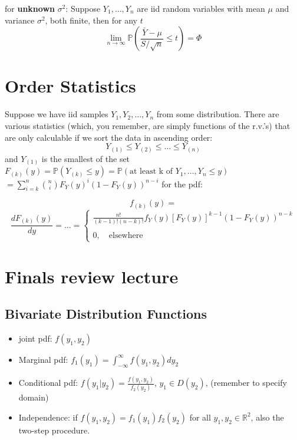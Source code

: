\documentclass{report}
\begin{document}
for \textbf{unknown} $\sigma^2$: Suppose $Y_1,\dots,Y_n$ are iid random variables with mean $\mu$ and variance $\sigma^2$, both finite, then for any $t$
$$\lim_{n \rightarrow \infty}\mathbb{P}(\frac{\bar{Y}-\mu}{S/\sqrt{n}} \leq t) = \Phi $$

\chapter{Order Statistics}
Suppose we have iid samples ${Y_1, Y_2, \dots,Y_n }$ from some
distribution. There are various statistics (which, you remember, are
simply functions of the r.v.’s) that are only calculable if we sort the
data in ascending order:
$$Y_{(1)} \leq Y_{(2)} \leq \dots \leq Y_{(n)}$$ and $Y_{(1)}$ is the smallest of the set
$F_{(k)}(y) = \mathbb{P}(Y_{(k)} \leq y) = \mathbb{P}(\text{at least k of } Y_{1},\dots, Y_{n} \leq y)$
$= \sum_{i=k}^{n} {n \choose i}F_Y(y)^i(1-F_Y(y))^{n-i}$
for the pdf: 

$$f_{(k)}(y) = $$ 
\[ 
\frac{dF_{(k)}(y)}{dy} = \dots = 
\begin{cases}
	\frac{n!}{(k-1)!(n-k)!}f_{Y}(y)[F_{Y}(y)]^{k-1}(1-F_{Y}(y))^{n-k}  \\ \\
	0, \quad \text{elsewhere}
\end{cases}
\]
\chapter{Finals review lecture}
\section{Bivariate Distribution Functions}

\begin{itemize}
	\item joint pdf: $f(y_1,y_2)$
	\item Marginal pdf: $f_1(y_1) = \int_{-\infty}^{\infty}f(y_1,y_2)dy_2$
	\item Conditional pdf: $f(y_1 | y_2) = \frac{f(y_1,y_2)}{f_2(y_2)}$, \quad $y_1 \in D(y_2)$, (remember to specify domain)
	\item Independence: if $f(y_1,y_2) = f_1(y_1)f_2(y_2)$ for all $y_1,y_2 \in \mathbb{R}^2$, also the two-step procedure.
\end{itemize}
\end{document}
